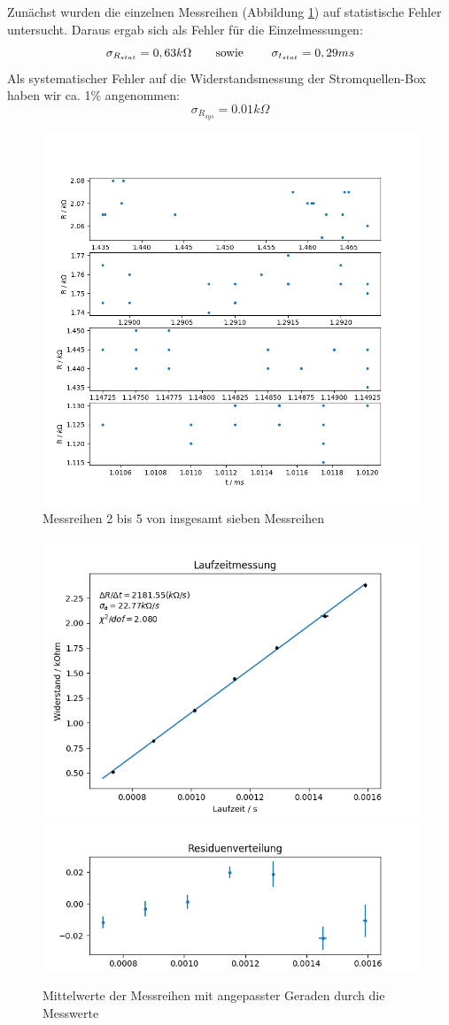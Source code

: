 \documentclass[12pt,a4paper]{article}
\begin{document}
	Zunächst wurden die einzelnen Messreihen (Abbildung \ref{pic:messreihen_laufzeit}) auf statistische Fehler untersucht. Daraus ergab sich als Fehler für die Einzelmessungen:
	\begin{equation}
	\sigma _{R_{stat}} = 0,63 k\Omega \text{\qquad sowie \qquad} \sigma_{t_{stat}} = 0,29 ms
	\end{equation}
	Als systematischer Fehler auf die Widerstandsmessung der Stromquellen-Box haben wir ca. 1\% angenommen: 
	\begin{equation}
	\sigma_{R_{sys}} = 0.01 k \Omega
	\end{equation}
	\begin{figure}
	\begin{center}
		\includegraphics[width=0.6\linewidth]{messreihen_2bis5_laufzeit}
		\caption{Messreihen 2 bis 5 von insgesamt sieben Messreihen}
		\label{pic:messreihen_laufzeit}
	\end{center}
	\end{figure}	
	\begin{figure}
	\begin{center}	
		\includegraphics[width=0.55\linewidth]{fit_laufzeit}
		\includegraphics[width=0.55\linewidth]{residuen_laufzeit}
		\caption{Mittelwerte der Messreihen mit angepasster Geraden durch die Messwerte}
		\label{pic:fit_laufzeit}
		
		
	\end{center}
	\end{figure}
\end{document}
